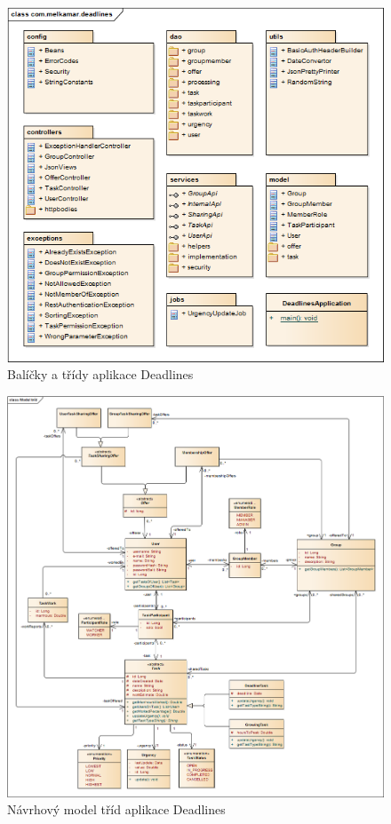 \documentclass[thesis=B,czech]{FITthesis}[2012/06/26]
\begin{document}
\begin{figure}\centering
	\includegraphics[width=1\textwidth]{ea-diagrams/packages/root.png}
	\caption[Balíčky tříd]{Balíčky a třídy aplikace Deadlines}
	\label{diagram:packages-root}
\end{figure}

\begin{figure}\centering
	\includegraphics[width=1\textwidth]{ea-diagrams/class-model.png}
	\caption[Model tříd]{Návrhový model tříd aplikace Deadlines}
	\label{diagram:class-model}
\end{figure}
\end{document}
